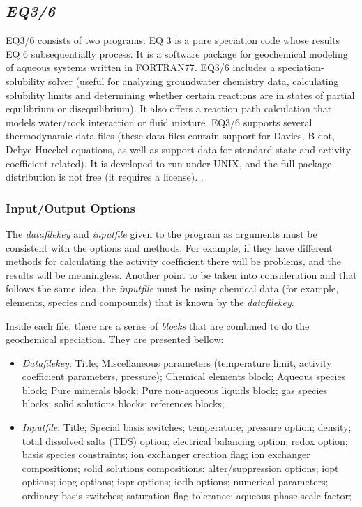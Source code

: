 \documentclass[ppgc,mestrado,English]{iiufrgs}
\begin{document}
\subsection{\emph{EQ3/6}}
EQ3/6 consists of two programs: EQ 3 is a pure speciation code whose results EQ 6 subsequentially process. It is a software package for geochemical modeling of aqueous systems written in FORTRAN77. EQ3/6 includes a speciation-solubility solver (useful for analyzing groundwater chemistry data, calculating solubility limits and determining whether certain reactions are in states of partial equilibrium or disequilibrium). It also offers a reaction path calculation that models water/rock interaction or fluid mixture. EQ3/6 supports several thermodynamic data files (these data files contain support for Davies, B-dot, Debye-Hueckel equations, as well as support data for standard state and activity coefficient-related). It is developed to run under UNIX, and the full package distribution is not free (it requires a license). \cite{Wolery:79} \cite{Wolery:90} \cite{Wolery:92}.

\subsubsection{Input/Output Options}
The \emph{datafilekey} and \emph{inputfile} given to the program as arguments must be consistent with the options and methods. For example, if they have different methods for calculating the activity coefficient there will be problems, and the results will be meaningless. Another point to be taken into consideration and that follows the same idea, the \emph{inputfile} must be using chemical data (for example, elements, species and compounds) that is known by the \emph{datafilekey}.

Inside each file, there are a series of \emph{blocks} that are combined to do the geochemical speciation. They are presented bellow:
\begin{itemize}
\item \emph{Datafilekey}: Title; Miscellaneous parameters (temperature limit, activity coefficient parameters, pressure); Chemical elements block; Aqueous species block; Pure minerals block; Pure non-aqueous liquids block; gas species blocks; solid solutions blocks; references blocks;
\item \emph{Inputfile}: Title; Special basis switches; temperature; pressure option; density; total dissolved salts (TDS) option; electrical balancing option; redox option; basis species constraints; ion exchanger creation flag; ion exchanger compositions; solid solutions compositions; alter/suppression options; iopt options; iopg options; iopr options; iodb options; numerical parameters; ordinary basis switches; saturation flag tolerance; aqueous phase scale factor;
\end{itemize}
\end{document}
